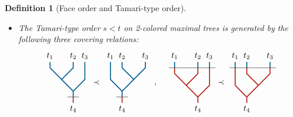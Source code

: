 \documentclass[twoside, 12pt]{amsart}
\newtheorem{definition}{Definition}[section]
\theoremstyle{remark}
\begin{document}
\begin{definition}[Face order and Tamari-type order]
\begin{itemize}
\item[$\diamond$] The \emph{Tamari-type order} $s<t$ on  2-colored maximal trees is generated by the following three  covering relations: 
\[
{\vcenter{\hbox{
\begin{tikzpicture}[yscale=0.5,xscale=0.5]
\draw[very thick, MidnightBlue] (0,-0.5)--(0,0) -- (-2,2)--(-2,2.5);
\draw[very thick, MidnightBlue] (-1,1)--(0,2)--(0,2.5) ;
\draw[very thick, MidnightBlue] (0,0)--(1,1)--(1,2.5) ;
%
\draw[very thick, BrickRed] (0,-0.5)--(0,-1) ;
%
\draw (-0.5,-0.5) --(0.5, -0.5);
%
\draw (-2,2.5) node[above] {$t_1$}; 
\draw (0,2.5) node[above] {$t_2$}; 
\draw (1,2.5) node[above] {$t_3$}; 
\draw (0,-1) node[below] {$t_4$}; 
\end{tikzpicture}}}}
\prec
{\vcenter{\hbox{
\begin{tikzpicture}[yscale=0.5,xscale=0.5]
\draw[very thick, MidnightBlue] (0,-0.5)--(0,0) -- (2,2)--(2,2.5);
\draw[very thick, MidnightBlue] (1,1)--(0,2)--(0,2.5) ;
\draw[very thick, MidnightBlue] (0,0)--(-1,1)--(-1,2.5) ;
%
\draw[very thick, BrickRed] (0,-0.5)--(0,-1) ;
%
\draw (-0.5,-0.5) --(0.5, -0.5);
%
\draw (2,2.5) node[above] {$t_3$}; 
\draw (0,2.5) node[above] {$t_2$}; 
\draw (-1,2.5) node[above] {$t_1$}; 
\draw (0,-1) node[below] {$t_4$}; 
\end{tikzpicture}}}}\ , \quad 
{\vcenter{\hbox{
\begin{tikzpicture}[yscale=0.5,xscale=0.5]
\draw[very thick, MidnightBlue] (-2, 2.5)--(-2, 3) ;
\draw[very thick, MidnightBlue] (0, 2.5)--(0, 3) ;
\draw[very thick, MidnightBlue] (1, 2.5)--(1, 3) ;
%
\draw[very thick, BrickRed] (0,-0.5)--(0,0) -- (-2,2)--(-2,2.5);
\draw[very thick, BrickRed] (-1,1)--(0,2)--(0,2.5) ;
\draw[very thick, BrickRed] (0,0)--(1,1)--(1,2.5) ;
%
\draw (-2.5,2.5) --(1.5, 2.5);
%
\draw (-2,3) node[above] {$t_1$}; 
\draw (0,3) node[above] {$t_2$}; 
\draw (1,3) node[above] {$t_3$}; 
\draw (0,-0.5) node[below] {$t_4$}; 
\end{tikzpicture}}}}
\prec
{\vcenter{\hbox{
\begin{tikzpicture}[yscale=0.5,xscale=0.5]
\draw[very thick, BrickRed] (0,-0.5)--(0,0) -- (2,2)--(2,2.5);
\draw[very thick, BrickRed] (1,1)--(0,2)--(0,2.5) ;
\draw[very thick, BrickRed] (0,0)--(-1,1)--(-1,2.5) ;
%
\draw[very thick, MidnightBlue] (2,2.5)--(2,3) ;
\draw[very thick, MidnightBlue] (0,2.5)--(0,3) ;
\draw[very thick, MidnightBlue] (-1,2.5)--(-1,3) ;
%
\draw (-1.5,2.5) --(2.5, 2.5);
%
\draw (2,3) node[above] {$t_3$}; 
\draw (0,3) node[above] {$t_2$}; 
\draw (-1,3) node[above] {$t_1$}; 
\draw (0,-0.5) node[below] {$t_4$}; 

\end{tikzpicture}}}}\]
\end{itemize}
\end{definition}
\end{document}
